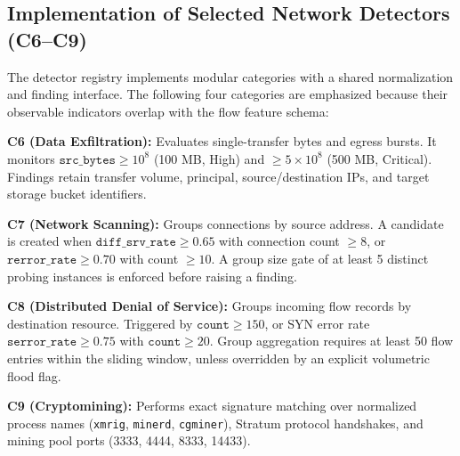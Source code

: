 \documentclass[conference]{IEEEtran}
\begin{document}
\subsection{Implementation of Selected Network Detectors (C6--C9)}
The detector registry implements modular categories with a shared normalization and finding interface. The following four categories are emphasized because their observable indicators overlap with the flow feature schema:

\textbf{C6 (Data Exfiltration):} Evaluates single-transfer bytes and egress bursts. It monitors $\texttt{src\_bytes} \ge 10^8$ (100 MB, High) and $\ge 5 \times 10^8$ (500 MB, Critical). Findings retain transfer volume, principal, source/destination IPs, and target storage bucket identifiers.

\textbf{C7 (Network Scanning):} Groups connections by source address. A candidate is created when $\texttt{diff\_srv\_rate} \ge 0.65$ with connection count $\ge 8$, or $\texttt{rerror\_rate} \ge 0.70$ with count $\ge 10$. A group size gate of at least 5 distinct probing instances is enforced before raising a finding.

\textbf{C8 (Distributed Denial of Service):} Groups incoming flow records by destination resource. Triggered by $\texttt{count} \ge 150$, or SYN error rate $\texttt{serror\_rate} \ge 0.75$ with $\texttt{count} \ge 20$. Group aggregation requires at least 50 flow entries within the sliding window, unless overridden by an explicit volumetric flood flag.

\textbf{C9 (Cryptomining):} Performs exact signature matching over normalized process names (\texttt{xmrig}, \texttt{minerd}, \texttt{cgminer}), Stratum protocol handshakes, and mining pool ports (3333, 4444, 8333, 14433).
\end{document}
